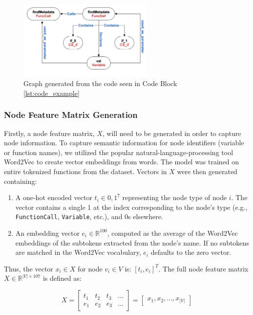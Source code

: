 \documentclass{article}
\begin{document}
\begin{figure}[htbp]  %
    \centering
    \includegraphics[width=0.6\textwidth]{graph_for_entry_9_in_db.png} 
    \caption{Graph generated from the code seen in Code Block \ref{lst:code_example}}  %
    \label{fig:graph_example}  %
\end{figure}

\subsubsection{Node Feature Matrix Generation}
Firstly, a node feature matrix, $X$, will need to be generated in order to capture node information. To capture semantic information for node identifiers (variable or function names), we utilized the popular natural-language-processing tool Word2Vec \cite{word2vec} to create vector embeddings from words. The model was trained on entire tokenized functions from the dataset. Vectors in $X$ were then generated containing: 
\begin{enumerate}
    \item A one-hot encoded vector $t_i \in {0, 1}^7$ representing the node type of node $i$. The vector contains a single 1 at the index corresponding to the node’s type (e.g., \texttt{FunctionCall}, \texttt{Variable}, etc.), and 0s elsewhere.
    \item An embedding vector $e_i \in \mathbb{R}^{100}$, computed as the average of the Word2Vec embeddings of the subtokens extracted from the node's name. If no subtokens are matched in the Word2Vec vocabulary, $e_i$ defaults to the zero vector.
\end{enumerate}
Thus, the vector $x_i \in X$ for node $v_i \in V$ is: $[t_i, e_i]^T$. 
The full node feature matrix \( X \in \mathbb{R}^{|V| \times 107} \) is defined as:

\[
X = 
\begin{bmatrix}
t_1 & t_2 & t_3 & \dots \\
e_1 & e_2 & e_3 & \dots
\end{bmatrix}
=
\begin{bmatrix}
x_1, x_2, \dots, x_{|V|}
\end{bmatrix}
\]
\end{document}
